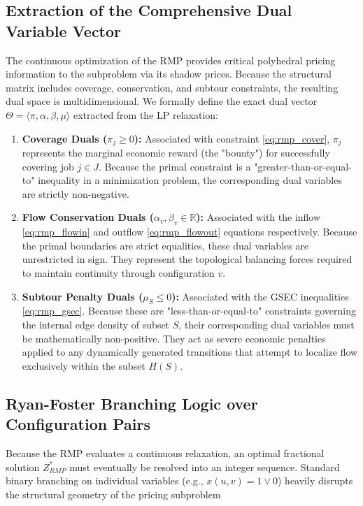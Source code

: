 \documentclass[11pt, a4paper]{book}
\begin{document}
	\subsection{Extraction of the Comprehensive Dual Variable Vector}
	
	The continuous optimization of the RMP provides critical polyhedral pricing information to the subproblem via its shadow prices. Because the structural matrix includes coverage, conservation, and subtour constraints, the resulting dual space is multidimensional. We formally define the exact dual vector $\Theta = \langle \pi, \alpha, \beta, \mu \rangle$ extracted from the LP relaxation:
	
	\begin{enumerate}
		\item \textbf{Coverage Duals ($\pi_j \ge 0$):} Associated with constraint \eqref{eq:rmp_cover}, $\pi_j$ represents the marginal economic reward (the "bounty") for successfully covering job $j \in J$. Because the primal constraint is a "greater-than-or-equal-to" inequality in a minimization problem, the corresponding dual variables are strictly non-negative.
		
		\item \textbf{Flow Conservation Duals ($\alpha_v, \beta_v \in \mathbb{R}$):} Associated with the inflow \eqref{eq:rmp_flowin} and outflow \eqref{eq:rmp_flowout} equations respectively. Because the primal boundaries are strict equalities, these dual variables are unrestricted in sign. They represent the topological balancing forces required to maintain continuity through configuration $v$.
		
		\item \textbf{Subtour Penalty Duals ($\mu_S \le 0$):} Associated with the GSEC inequalities \eqref{eq:rmp_gsec}. Because these are "less-than-or-equal-to" constraints governing the internal edge density of subset $S$, their corresponding dual variables must be mathematically non-positive. They act as severe economic penalties applied to any dynamically generated transitions that attempt to localize flow exclusively within the subset $H(S)$.
	\end{enumerate}
	
	\subsection{Ryan-Foster Branching Logic over Configuration Pairs}
	
	Because the RMP evaluates a continuous relaxation, an optimal fractional solution $Z_{RMP}^*$ must eventually be resolved into an integer sequence. Standard binary branching on individual variables (e.g., $x(u,v) = 1 \lor 0$) heavily disrupts the structural geometry of the pricing subproblem %
	
\end{document}
